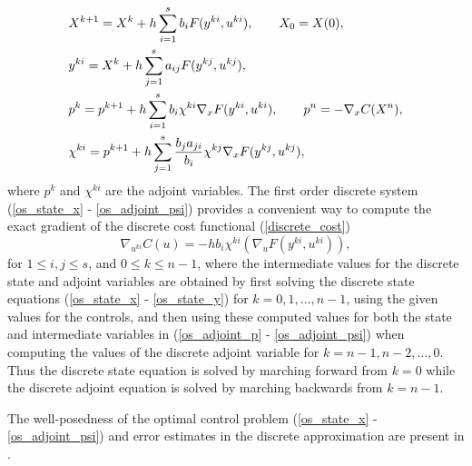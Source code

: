 \documentclass[a4paper,10pt, english]{article}
\newcommand{\D}{\displaystyle}
\begin{document}
  \begin{align}
   \D
    & X^{k+1}  = X^k + h\sum_{i=1}^{s}b_iF(y^{ki}, u^{ki}), \qquad X_0 = X(0),   \label{os_state_x}\\
 	& y^{ki} = X^k + h\sum_{j=1}^{s}a_{ij}F(y^{kj}, u^{kj}),   \label{os_state_y}\\
 	& p^k = p^{k+1} + h\sum_{i=1}^{s}b_i \chi^{ki}\nabla_x F(y^{ki}, u^{ki}), \qquad p^n = - \nabla_xC(X^n),  \label{os_adjoint_p}\\
 	& \chi^{ki} = p^{k+1} + h\sum_{j=1}^{s} \frac{b_j a_{ji}}{b_i}\chi^{kj}\nabla_x F(y^{kj}, u^{kj}), \label{os_adjoint_psi} 
   \end{align}
where $p^k$ and $\chi^{ki}$ are the adjoint variables.
The first order discrete system (\ref{os_state_x} - \ref{os_adjoint_psi}) provides a convenient way to compute the exact gradient of the discrete cost functional (\ref{discrete_cost})
\begin{equation}
\nabla_{u^{ki}} C(u) = -h b_i \chi^{ki} (\nabla_u F(y^{ki}, u^{ki})), 
\label{discretegradient}
 \end{equation}  
 for $1\leq i, j\leq s$, and $0\leq k\leq n-1$, where the intermediate values for the discrete state and adjoint variables are obtained by first
 solving the discrete state equations (\ref{os_state_x} - \ref{os_state_y}) for $k=0, 1, \dots, n-1$, using the given values for the controls, and then using these computed values for both the state and intermediate variables in (\ref{os_adjoint_p} - \ref{os_adjoint_psi}) when computing the values of the discrete adjoint variable for $k=n-1, n-2, \dots, 0$. Thus the discrete state equation is solved by marching forward from 
 $ k = 0$ while the discrete adjoint equation is solved by marching backwards from $k = n-1$.
 
 The well-posedness of the optimal control problem (\ref{os_state_x} - \ref{os_adjoint_psi}) and error estimates in the discrete approximation are present in \cite{Hager2000}.
 
\end{document}
